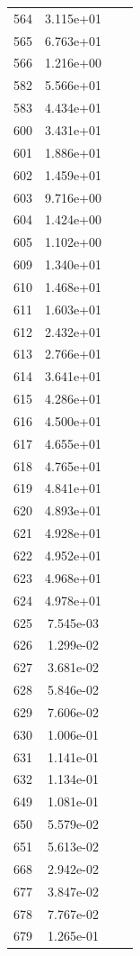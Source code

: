 \documentclass[12pt]{article}
\begin{document}
\begin{longtable}{@{}cccc@{}}
564 & 3.115e+01 &  &  \\
565 & 6.763e+01 &  &  \\
566 & 1.216e+00 &  &  \\
582 & 5.566e+01 &  &  \\
583 & 4.434e+01 &  &  \\
600 & 3.431e+01 &  &  \\
601 & 1.886e+01 &  &  \\
602 & 1.459e+01 &  &  \\
603 & 9.716e+00 &  &  \\
604 & 1.424e+00 &  &  \\
605 & 1.102e+00 &  &  \\
609 & 1.340e+01 &  &  \\
610 & 1.468e+01 &  &  \\
611 & 1.603e+01 &  &  \\
612 & 2.432e+01 &  &  \\
613 & 2.766e+01 &  &  \\
614 & 3.641e+01 &  &  \\
615 & 4.286e+01 &  &  \\
616 & 4.500e+01 &  &  \\
617 & 4.655e+01 &  &  \\
618 & 4.765e+01 &  &  \\
619 & 4.841e+01 &  &  \\
620 & 4.893e+01 &  &  \\
621 & 4.928e+01 &  &  \\
622 & 4.952e+01 &  &  \\
623 & 4.968e+01 &  &  \\
624 & 4.978e+01 &  &  \\
625 & 7.545e-03 &  &  \\
626 & 1.299e-02 &  &  \\
627 & 3.681e-02 &  &  \\
628 & 5.846e-02 &  &  \\
629 & 7.606e-02 &  &  \\
630 & 1.006e-01 &  &  \\
631 & 1.141e-01 &  &  \\
632 & 1.134e-01 &  &  \\
649 & 1.081e-01 &  &  \\
650 & 5.579e-02 &  &  \\
651 & 5.613e-02 &  &  \\
668 & 2.942e-02 &  &  \\
677 & 3.847e-02 &  &  \\
678 & 7.767e-02 &  &  \\
679 & 1.265e-01 &  &  \\

\bottomrule
\end{longtable}
\end{document}
